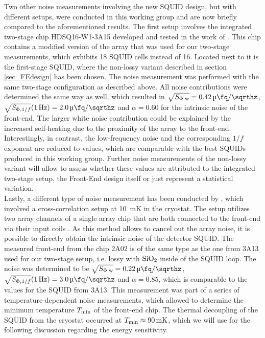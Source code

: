 Two other noise measurements involving the new SQUID design, but with different setups, were conducted in this working group and are now briefly compared to the aforementioned results. The first setup involves the integrated two-stage chip HDSQ16-W1-3A15 developed and tested in the work of \cite{Kraemer2023}. This chip contains a modified version of the array that was used for our two-stage measurements, which exhibits 18 SQUID cells instead of 16. Located next to it is the first-stage SQUID, where the non-lossy variant described in section \ref{sec_FEdesign} has been chosen. The noise measurement was performed with the same two-stage configuration as described above. All noise contributions were determined the same way as well, which resulted in $\sqrt{S_{\rm \Phi,w}}=\qty{0.42}{\micro\fq\per\sqrthz}$, $\sqrt{S_{{\rm \Phi},1/f}}(\qty{1}{\Hz})=\qty{2.0}{\micro\fq\per\sqrthz}$ and $\alpha=0.60$ for the  intrinsic noise of the front-end. The larger white noise contribution could be explained by the increased self-heating due to the proximity of the array to the front-end. Interestingly, in contrast, the low-frequency noise and the corresponding $1/f$ exponent are reduced to values, which are comparable with the best SQUIDs produced in this working group. Further noise measurements of the non-lossy variant will allow to assess whether these values are attributed to the integrated two-stage setup, the Front-End design itself or just represent a statistical variation. \\
Lastly, a different type of noise measurement has been conducted by \cite{Mazibrada2024}, which involved a cross-correlation setup at \qty{10}{\milli\kelvin} in the cryostat. The setup utilizes two array channels of a single array chip that are both connected to the front-end via their input coils \cite{Herbst2023}. As this method allows to cancel out the array noise, it is possible to directly obtain the intrinsic noise of the detector SQUID. The measured front-end from the chip 2A02 is of the same type as the one from 3A13 used for our two-stage setup, i.e. lossy with ${\rm SiO_2}$ inside of the SQUID loop. The noise was determined to be $\sqrt{S_{\rm \Phi,w}}=\qty{0.22}{\micro\fq\per\sqrthz}$, $\sqrt{S_{{\rm \Phi},1/f}}(\qty{1}{\Hz})=\qty{3.0}{\micro\fq\per\sqrthz}$ and $\alpha=0.85$, which is comparable to the values for the SQUID from 3A13. This measurement was part of a series of temperature-dependent noise measurements, which allowed to determine the minimum temperature $T_{\rm min}$ of the front-end chip. The thermal decoupling of the SQUID from the cryostat occurred at $T_{\rm min}\approx\qty{90}{\milli\kelvin}$, which we will use for the following discussion regarding the energy sensitivity. \\

